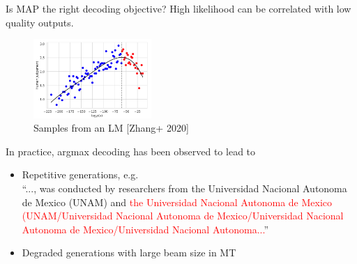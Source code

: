 \documentclass[usenames,dvipsnames,11pt,aspectratio=169]{beamer}
\begin{document}
\begin{frame}
    {Is MAP the right decoding objective?}
    High likelihood can be correlated with low quality outputs.
    \vspace{-1em}
    \begin{figure}
        \includegraphics[height=3cm]{figures/likelihood-trap}
        \caption{Samples from an LM [Zhang+ 2020]}
    \end{figure}
    \vspace{-2em}

    In practice, argmax decoding has been observed to lead to\\
    \begin{itemize}
        \item Repetitive generations, e.g.\\
            {\footnotesize
                ``..., was conducted by researchers from the Universidad Nacional Autonoma de Mexico (UNAM) and \textcolor{red}{the Universidad Nacional Autonoma de Mexico (UNAM/Universidad Nacional Autonoma de Mexico/Universidad Nacional Autonoma de Mexico/Universidad Nacional Autonoma...}''}
        \item Degraded generations with large beam size in MT
    \end{itemize}
\end{frame}
\end{document}
